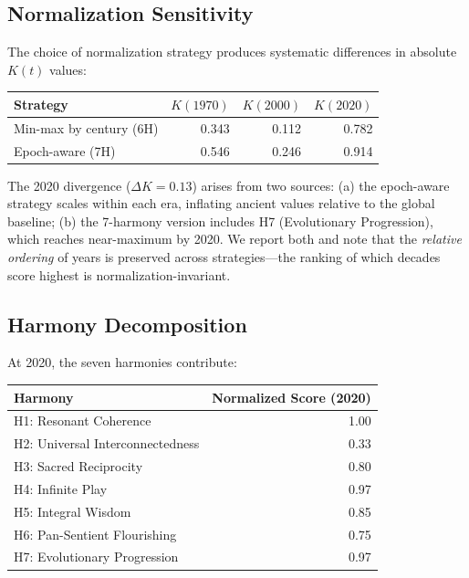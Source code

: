 \documentclass[10pt,letterpaper]{article}
\newcommand{\kt}{$K(t)$}
\begin{document}
\subsection*{Normalization Sensitivity}

The choice of normalization strategy produces systematic differences
in absolute \kt{} values:

\begin{center}
\begin{tabular}{lrrr}
\toprule
Strategy & $K(1970)$ & $K(2000)$ & $K(2020)$ \\
\midrule
Min-max by century (6H) & 0.343 & 0.112 & 0.782 \\
Epoch-aware (7H) & 0.546 & 0.246 & 0.914 \\
\bottomrule
\end{tabular}
\end{center}

The 2020 divergence ($\Delta K = 0.13$) arises from two sources:
(a) the epoch-aware strategy scales within each era, inflating ancient
values relative to the global baseline; (b) the 7-harmony version
includes H7 (Evolutionary Progression), which reaches near-maximum by
2020. We report both and note that the \emph{relative ordering} of
years is preserved across strategies---the ranking of which decades
score highest is normalization-invariant.

\subsection*{Harmony Decomposition}

At 2020, the seven harmonies contribute:

\begin{center}
\begin{tabular}{lr}
\toprule
Harmony & Normalized Score (2020) \\
\midrule
H1: Resonant Coherence & 1.00 \\
H2: Universal Interconnectedness & 0.33 \\
H3: Sacred Reciprocity & 0.80 \\
H4: Infinite Play & 0.97 \\
H5: Integral Wisdom & 0.85 \\
H6: Pan-Sentient Flourishing & 0.75 \\
H7: Evolutionary Progression & 0.97 \\
\bottomrule
\end{tabular}
\end{center}
\end{document}
